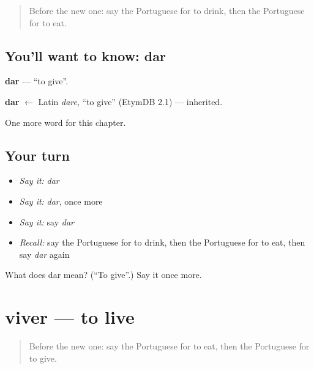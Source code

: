 \label{lesson:PT-C43-dar}



\begin{quote}
Before the new one: say the Portuguese for to drink, then the Portuguese for to eat.
\end{quote}

\subsection*{You'll want to know: dar}
\textbf{dar} — \textquotedblleft{}to give\textquotedblright{}.

\begin{cousinweb}
\textbf{dar} $\leftarrow$ Latin \emph{dare}, \textquotedblleft{}to give\textquotedblright{} (EtymDB 2.1) — inherited.
\end{cousinweb}

\begin{grammarlens}[title={What you've built}]
One more word for this chapter.
\end{grammarlens}

\subsection*{Your turn}
\begin{itemize}
\raggedright
  \item \emph{Say it:} \emph{dar}
  \item \emph{Say it:} \emph{dar}, once more
  \item \emph{Say it:} say \emph{dar}
  \item \emph{Recall:} say the Portuguese for to drink, then the Portuguese for to eat, then say \emph{dar} again
\end{itemize}

\begin{tcolorbox}[breakable,colback=teal!4,colframe=teal!35!black,title={Before you move on}]
What does dar mean? (\textquotedblleft{}To give\textquotedblright{}.) Say it once more.
\end{tcolorbox}
\section[viver]{viver — to live}

\label{lesson:PT-C43-viver}



\begin{quote}
Before the new one: say the Portuguese for to eat, then the Portuguese for to give.
\end{quote}

